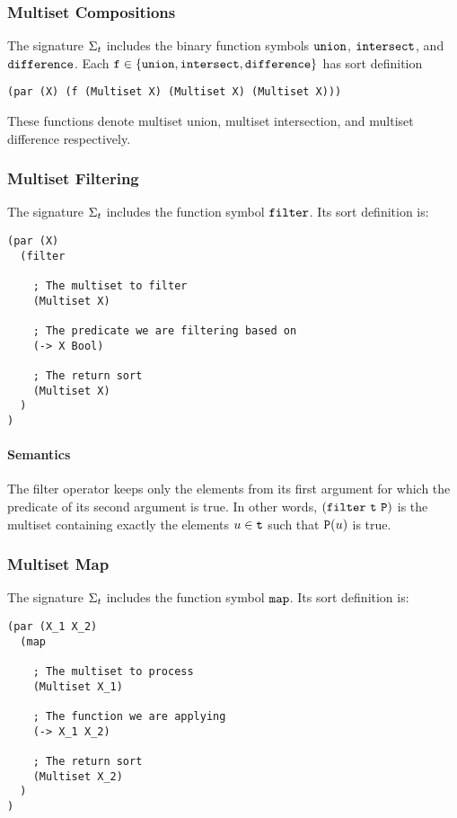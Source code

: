 \documentclass[english,a4paper,10pt]{article}
\begin{document}
\subsubsection{Multiset Compositions}
The signature $\Sigma_{t}$ includes 
the binary function symbols 
${\tt union}$, ${\tt intersect}$, and ${\tt difference}$.
Each ${\tt f} \in \{ {\tt union}, {\tt intersect}, {\tt difference} \}$
has sort definition
\begin{verbatim}
(par (X) (f (Multiset X) (Multiset X) (Multiset X)))
\end{verbatim}
These functions denote multiset union, multiset intersection, and multiset difference
respectively.

\subsubsection{Multiset Filtering}
The signature $\Sigma_{t}$ includes 
the function symbol ${\tt filter}$. Its sort definition is:

\begin{verbatim}
(par (X)
  (filter
  
    ; The multiset to filter
    (Multiset X)
    
    ; The predicate we are filtering based on
    (-> X Bool)
    
    ; The return sort
    (Multiset X)
  )
)
\end{verbatim}

\paragraph{Semantics}
The filter operator keeps only the elements
from its first argument
for which the predicate of its second argument is true.
In other words,
${\tt (filter\ t\ P)}$
is the multiset containing exactly
the elements $u \in {\tt t}$
such that ${\tt P}(u)$ is true.

\subsubsection{Multiset Map}
The signature $\Sigma_{t}$ includes 
the function symbol ${\tt map}$. Its sort definition is:

\begin{verbatim}
(par (X_1 X_2)
  (map
  
    ; The multiset to process
    (Multiset X_1)
    
    ; The function we are applying
    (-> X_1 X_2)
    
    ; The return sort
    (Multiset X_2)
  )
)
\end{verbatim}
\end{document}
